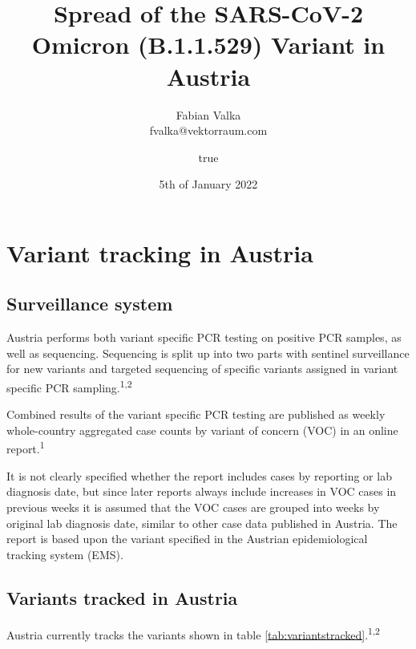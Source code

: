 \documentclass[
]{article}
\author{Fabian Valka \\ fvalka@vektorraum.com}
\affil{vektorraum}
\title{Spread of the SARS-CoV-2 Omicron (B.1.1.529) Variant in Austria}
\author{true}
\date{5th of January 2022}
\begin{document}
\maketitle

{
\setcounter{tocdepth}{2}
\tableofcontents
}
\hypertarget{variant-tracking-in-austria}{%
\section{Variant tracking in Austria}\label{variant-tracking-in-austria}}

\hypertarget{surveillance-system}{%
\subsection{Surveillance system}\label{surveillance-system}}

Austria performs both variant specific PCR testing on positive PCR samples, as well as sequencing.
Sequencing is split up into two parts with sentinel surveillance for new variants and
targeted sequencing of specific variants assigned in variant specific PCR sampling.\textsuperscript{1,2}

Combined results of the variant specific PCR testing are published as weekly
whole-country aggregated case counts by variant of concern (VOC) in an online report.\textsuperscript{1}

It is not clearly specified whether the report includes cases by reporting or lab diagnosis date,
but since later reports always include increases in VOC cases in previous weeks it is assumed that
the VOC cases are grouped into weeks by original lab diagnosis date, similar to other case data
published in Austria. The report is based upon the variant specified in the Austrian epidemiological tracking system (EMS).

\hypertarget{variants-tracked-in-austria}{%
\subsection{Variants tracked in Austria}\label{variants-tracked-in-austria}}

Austria currently tracks the variants shown in table \ref{tab:variantstracked}.\textsuperscript{1,2}
\end{document}
